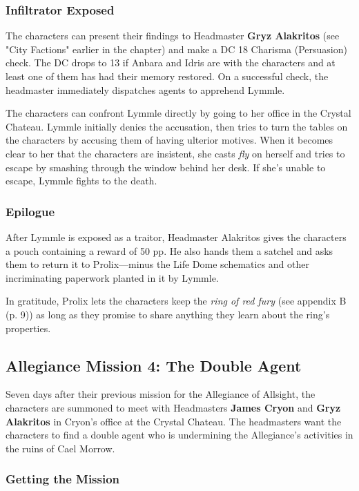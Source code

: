 \documentclass[letterpaper, 11pt, bg=full, twocolumn]{dndbook}
\begin{document}
\subsubsection{Infiltrator Exposed}

The characters can present their findings to Headmaster \textbf{Gryz Alakritos} (see "City Factions" earlier in the chapter) and make a DC 18 Charisma (Persuasion) check. The DC drops to 13 if Anbara and Idris are with the characters and at least one of them has had their memory restored. On a successful check, the headmaster immediately dispatches agents to apprehend Lymmle.

The characters can confront Lymmle directly by going to her office in the Crystal Chateau. Lymmle initially denies the accusation, then tries to turn the tables on the characters by accusing them of having ulterior motives. When it becomes clear to her that the characters are insistent, she casts \textit{fly} on herself and tries to escape by smashing through the window behind her desk. If she's unable to escape, Lymmle fights to the death.

\subsubsection{Epilogue}

After Lymmle is exposed as a traitor, Headmaster Alakritos gives the characters a pouch containing a reward of 50 pp. He also hands them a satchel and asks them to return it to Prolix---minus the Life Dome schematics and other incriminating paperwork planted in it by Lymmle.

In gratitude, Prolix lets the characters keep the \textit{ring of red fury} (see appendix B (p. 9)) as long as they promise to share anything they learn about the ring's properties.

\subsection{Allegiance Mission 4: The Double Agent}

Seven days after their previous mission for the Allegiance of Allsight, the characters are summoned to meet with Headmasters \textbf{James Cryon} and \textbf{Gryz Alakritos} in Cryon's office at the Crystal Chateau. The headmasters want the characters to find a double agent who is undermining the Allegiance's activities in the ruins of Cael Morrow.

\subsubsection{Getting the Mission}
\end{document}
